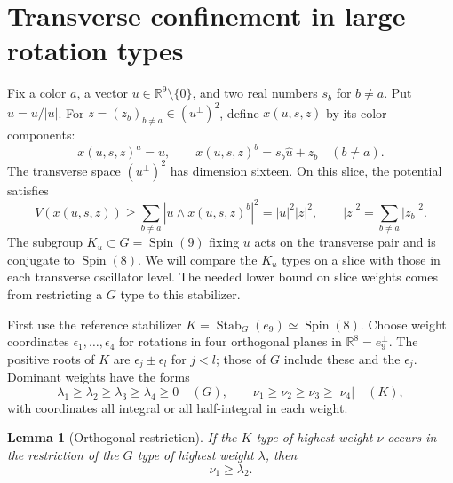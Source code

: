 \documentclass[11pt]{amsart}
\newcommand{\R}{\mathbb R}
\newcommand{\Spin}{\operatorname{Spin}}
\newtheorem{lemma}[theorem]{Lemma}
\theoremstyle{remark}
\numberwithin{equation}{section}
\begin{document}
\section{Transverse confinement in large rotation types}
\label{sec:confinement}

Fix a color $a$, a vector $u\in\R^9\setminus\{0\}$, and two real
numbers $s_b$ for $b\ne a$. Put $\widehat u=u/|u|$. For
$z=(z_b)_{b\ne a}\in(u^\perp)^2$, define $x(u,s,z)$ by its color
components:
\begin{equation}
 x(u,s,z)^a=u,\qquad
 x(u,s,z)^b=s_b\widehat u+z_b\quad(b\ne a).
 \label{eq:slice}
\end{equation}
The transverse space $(u^\perp)^2$ has dimension sixteen. On this
slice, the potential satisfies
\begin{equation}
 V(x(u,s,z))
 \geq\sum_{b\ne a}|u\wedge x(u,s,z)^b|^2
 =|u|^2|z|^2,\qquad |z|^2=\sum_{b\ne a}|z_b|^2.
 \label{eq:slice-potential}
\end{equation}
The subgroup $K_u\subset G=\Spin(9)$ fixing $u$ acts on the
transverse pair and is conjugate to $\Spin(8)$. We will compare the
$K_u$ types on a slice with those in each transverse oscillator level.
The needed lower bound on slice weights comes from restricting a
$G$ type to this stabilizer.

First use the reference stabilizer
$K=\operatorname{Stab}_G(e_9)\simeq\Spin(8)$.
Choose weight coordinates $\epsilon_1,\ldots,\epsilon_4$ for rotations
in four orthogonal planes in $\R^8=e_9^\perp$. The positive roots of
$K$ are $\epsilon_j\pm\epsilon_l$ for $j<l$; those of $G$ include
these and the $\epsilon_j$. Dominant weights have the forms
\[
 \lambda_1\geq\lambda_2\geq\lambda_3\geq\lambda_4\geq0
 \quad(G),\qquad
 \nu_1\geq\nu_2\geq\nu_3\geq|\nu_4|
 \quad(K),
\]
with coordinates all integral or all half-integral in each weight.

\begin{lemma}[Orthogonal restriction]
\label{lem:branching}
If the $K$ type of highest weight $\nu$ occurs in the restriction of
the $G$ type of highest weight $\lambda$, then
\begin{equation}
 \nu_1\geq\lambda_2.
 \label{eq:branching}
\end{equation}
\end{lemma}
\end{document}
